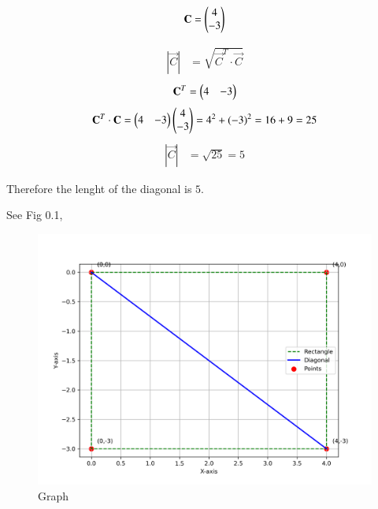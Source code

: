 \documentclass[journal]{IEEEtran}
\begin{document}
\begin{align}
\mathbf{C}= \begin{pmatrix}4 \\ -3\end{pmatrix} 
\end{align}

\begin{align}
\left|\vec{C} \right| &= \sqrt{ \vec{C}^T \cdot \vec{C}}
 \end{align}
 \begin{align}
     \mathbf{C}^T= \begin{pmatrix}4 & -3\end{pmatrix} 
 \end{align}    
\begin{align}
      \mathbf{C}^T \cdot \mathbf{C}=\begin{pmatrix}4 & -3\end{pmatrix}\begin{pmatrix}4 \\ -3\end{pmatrix} = 4^2 + (-3)^2 = 16 + 9 = 25
\end{align}
\begin{align}  
      \left|\vec{C}\right| &= \sqrt{25} = 5 
 \end{align}
 \begin{center}
Therefore the lenght of the diagonal is $5$.
 \end{center}

See Fig 0.1,
\begin{figure}[H]
\begin{center}
\includegraphics[width=0.7\columnwidth]{Figs/fig2.png}
\end{center}
\caption{Graph}
\label{fig:fig.py}
\end{figure}

 
\end{document}
